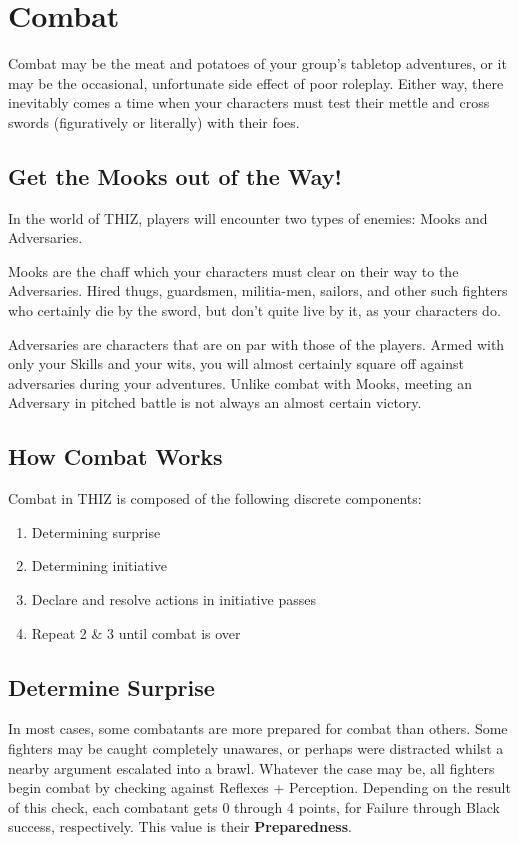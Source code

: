 \documentclass[oneside]{book}
\begin{document}
\chapter{Combat}
\begin{multicols}{2}
Combat may be the meat and potatoes of your group's tabletop adventures, or it may be the occasional, unfortunate side effect of poor roleplay. Either way, there inevitably comes a time when your characters must test their mettle and cross swords (figuratively or literally) with their foes. 

\section{Get the Mooks out of the Way!}
In the world of THIZ, players will encounter two types of enemies: Mooks and Adversaries. 

Mooks are the chaff which your characters must clear on their way to the Adversaries. Hired thugs, guardsmen, militia-men, sailors, and other such fighters who certainly die by the sword, but don't quite live by it, as your characters do. 

Adversaries are characters that are on par with those of the players. Armed with only your Skills and your wits, you will almost certainly square off against adversaries during your adventures. Unlike combat with Mooks, meeting an Adversary in pitched battle is not always an almost certain victory. 

\section{How Combat Works}
Combat in THIZ is composed of the following discrete components:
\begin{enumerate}
  \setlength{\itemsep}{0cm}%
  \setlength{\parskip}{0cm}%
  \item Determining surprise
  \item Determining initiative
  \item Declare and resolve actions in initiative passes
  \item Repeat 2 \& 3 until combat is over
\end{enumerate}

\section{Determine Surprise}
In most cases, some combatants are more prepared for combat than others. Some fighters may be caught completely unawares, or perhaps were distracted whilst a nearby argument escalated into a brawl. Whatever the case may be, all fighters begin combat by checking against Reflexes + Perception. Depending on the result of this check, each combatant gets 0 through 4 points, for Failure through Black success, respectively. This value is their \textbf{Preparedness}.  


\end{multicols}
\end{document}
